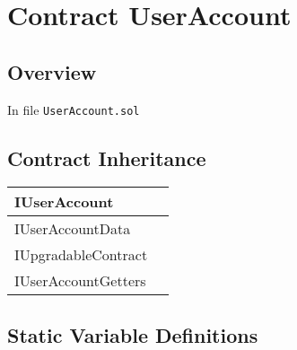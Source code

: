 
\chapter{Contract UserAccount}

\minitoc

\section{Overview}


In file {\tt UserAccount.sol}

\section{Contract Inheritance}


\noindent\begin{tabular}{|l|p{5cm}|}\hline
IUserAccount & \\\hline
IUserAccountData & \\\hline
IUpgradableContract & \\\hline
IUserAccountGetters & \\\hline
\end{tabular}


\section{Static Variable Definitions}


